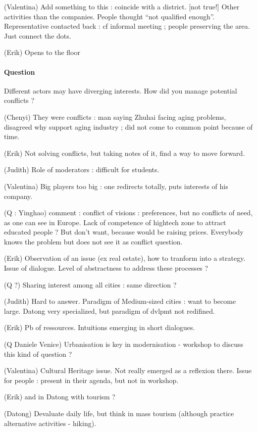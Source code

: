 \documentclass[11pt]{article}
\begin{document}
(Valentina) Add something to this : coincide with a district. [not true!] Other activities than the companies. People thought ``not qualified enough''. Representative contacted back : cf informal meeting ; people preserving the area. Just connect the dots.

(Erik) Opens to the floor


\paragraph{Question}

Different actors may have diverging interests. How did you manage potential conflicts ?

(Chenyi) They were conflicts : man saying Zhuhai facing aging problems, disagreed why support aging industry ; did not come to common point because of time.

(Erik) Not solving conflicts, but taking notes of it, find a way to move forward.

(Judith) Role of moderators : difficult for students. 

(Valentina) Big players too big : one redirects totally, puts interests of his company.

(Q : Yinghao) comment : conflict of visions : preferences, but no conflicts of need, as one can see in Europe. Lack of competence of hightech zone to attract educated people ? But don't want, because would be raising prices. Everybody knows the problem but does not see it as conflict question.

(Erik) Observation of an issue (ex real estate), how to tranform into a strategy. Issue of dialogue. Level of abstractness to address these processes ?


(Q ?) Sharing interest among all cities : same direction ? 

(Judith) Hard to answer. Paradigm of Medium-sized cities : want to become large. Datong very specialized, but paradigm of dvlpmt not redifined.

(Erik) Pb of ressources. Intuitions emerging in short dialogues. 

(Q Daniele Venice) Urbanisation is key in modernisation - workshop to discuss this kind of question ? 

(Valentina) Cultural Heritage issue. Not really emerged as a reflexion there. Issue for people : present in their agenda, but not in workshop.

(Erik) and in Datong with tourism ?

(Datong) Devaluate daily life, but think in mass tourism (although practice alternative activities - hiking).
\end{document}
